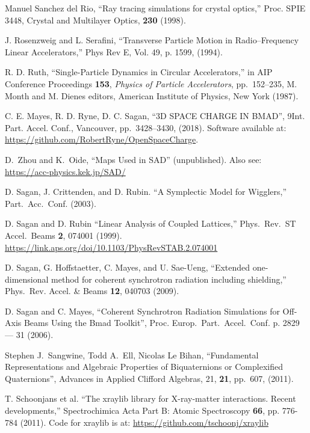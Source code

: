 \begin{thebibliography}{XXXXXXX99}
Manuel Sanchez del Rio, ``Ray tracing simulations for crystal optics,''
Proc. SPIE 3448, Crystal and Multilayer Optics, {\bf 230} (1998). 

J. Rosenzweig and L. Serafini, ``Transverse Particle Motion in
Radio--Frequency Linear Accelerators,'' Phys Rev E, Vol. 49, p. 1599,
(1994).

R. D. Ruth, ``Single-Particle Dynamics in
Circular Accelerators,'' in AIP Conference Proceedings {\bf 153}, {\em
Physics of Particle Accelerators}, pp.~152--235, M. Month and M. Dienes editors,
American Institute of Physics, New York (1987).

C. E. Mayes, R. D. Ryne, D. C. Sagan, 
``3D SPACE CHARGE IN BMAD'',
9\Th Int. Part. Accel. Conf., Vancouver, pp.~3428--3430, (2018).
Software available at: \url{https://github.com/RobertRyne/OpenSpaceCharge}.

D.~Zhou and K.~Oide, ``Maps Used in SAD'' (unpublished).
Also see:
\hfill\break
\hspace*{0.3in} \url{https://acc-physics.kek.jp/SAD/}

D. Sagan, J. Crittenden, and D. Rubin.
``A Symplectic Model for Wigglers,'' Part.\ Acc.\ Conf. (2003).

D. Sagan and D. Rubin ``Linear Analysis of Coupled Lattices,''
Phys.\ Rev.\ ST Accel.\ Beams {\bf 2}, 074001 (1999).
\hfill\break
\hspace*{20pt} 
\url{https://link.aps.org/doi/10.1103/PhysRevSTAB.2.074001}

D. Sagan, G. Hoffstaetter, C. Mayes, and U. Sae-Ueng,
``Extended one-dimensional method for coherent synchrotron radiation including shielding,''
Phys.\ Rev. Accel. \& Beams {\bf 12}, 040703 (2009).

D. Sagan and C. Mayes, 
``Coherent Synchrotron Radiation Simulations for Off-Axis Beams Using the Bmad Toolkit'',
Proc. Europ.\ Part.\ Accel.\ Conf. p. 2829 --- 31 (2006).

Stephen J.\ Sangwine, Todd A.\ Ell, Nicolas Le Bihan, 
``Fundamental Representations and Algebraic Properties of Biquaternions or Complexified Quaternions'',
Advances in Applied Clifford Algebras, 21, {\bf 21}, pp.~607, (2011).

T. Schoonjans et al. ``The xraylib library for X-ray-matter
interactions. Recent developments,'' Spectrochimica Acta Part B: Atomic
Spectroscopy {\bf 66}, pp. 776-784 (2011).
Code for xraylib is at: \hfill\break
\hspace*{0.3in}
\url{https://github.com/tschoonj/xraylib}


\end{thebibliography}

